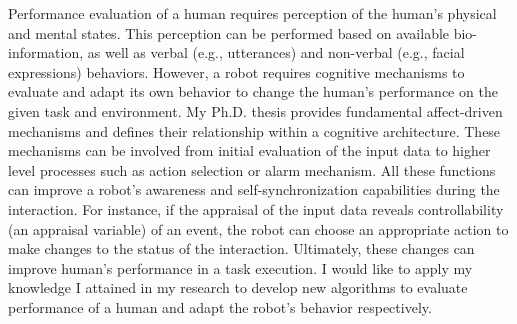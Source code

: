 \documentclass[a4paper, 10pt]{article}
\begin{document}
\begin{small}
Performance evaluation of a human requires perception of the human's physical
and mental states. This perception can be performed based on available
bio-information, as well as verbal (e.g., utterances) and non-verbal (e.g.,
facial expressions) behaviors. However, a robot requires cognitive mechanisms to
evaluate and adapt its own behavior to change the human's performance on the
given task and environment. My Ph.D. thesis provides fundamental affect-driven
mechanisms and defines their relationship within a cognitive architecture. These
mechanisms can be involved from initial evaluation of the input data to higher
level processes such as action selection or alarm mechanism. All these functions
can improve a robot's awareness and self-synchronization capabilities during the
interaction. For instance, if the appraisal of the input data reveals
controllability (an appraisal variable) of an event, the robot can choose an
appropriate action to make changes to the status of the interaction. Ultimately,
these changes can improve human's performance in a task execution. I would like
to apply my knowledge I attained in my research to develop new algorithms to
evaluate performance of a human and adapt the robot's behavior respectively.






\vspace{0.5cm}

\end{small}
\end{document}
